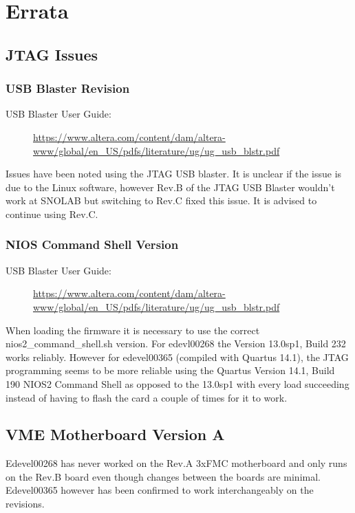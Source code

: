 \chapter{Errata}
\label{chap:errata}

\section{JTAG Issues}
\subsection{USB Blaster Revision}
\begin{description}
\item[USB Blaster User Guide:]\url{https://www.altera.com/content/dam/altera-www/global/en_US/pdfs/literature/ug/ug_usb_blstr.pdf}
\end{description}
Issues have been noted using the JTAG USB blaster. It is unclear if the issue is due to the Linux software, however Rev.B of the JTAG USB Blaster wouldn't work at SNOLAB but switching to Rev.C fixed this issue. It is advised to continue using Rev.C.

\subsection{NIOS Command Shell Version}
\begin{description}
\item[USB Blaster User Guide:]\url{https://www.altera.com/content/dam/altera-www/global/en_US/pdfs/literature/ug/ug_usb_blstr.pdf}
\end{description}
When loading the firmware it is necessary to use the correct nios2\_command\_shell.sh version. For edevl00268 the Version 13.0sp1, Build 232 works reliably. However for edevel00365 (compiled with Quartus 14.1), the JTAG programming seems to be more reliable using the Quartus Version 14.1, Build 190 NIOS2 Command Shell as opposed to the 13.0sp1 with every load succeeding instead of having to flash the card a couple of times for it to work.


\section{VME Motherboard Version A}
Edevel00268 has never worked on the Rev.A 3xFMC motherboard and only runs on the Rev.B board even though changes between the boards are minimal. Edevel00365 however has been confirmed to work interchangeably on the revisions.

